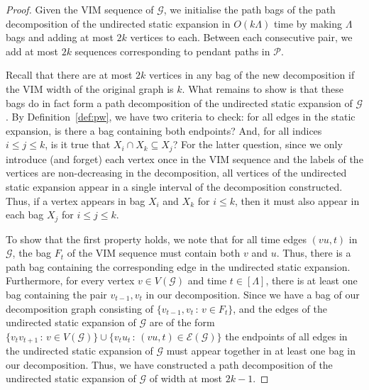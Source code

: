 \documentclass[a4paper,UKenglish,cleveref, autoref, thm-restate]{lipics-v2021} %
\begin{document}
\begin{proof}
    Given the VIM sequence of $\mathcal{G}$, we initialise the path bags of the path decomposition of the undirected static expansion in $O(k\Lambda)$ time by making $\Lambda$ bags and adding at most $2k$ vertices to each. Between each consecutive pair, we add at most $2k$ sequences corresponding to pendant paths in $\mathcal{P}$.

    Recall that there are at most $2k$ vertices in any bag of the new decomposition if the VIM width of the original graph is $k$. 
    What remains to show is that these bags do in fact form a path decomposition of the undirected static expansion of $\mathcal{G}$. By Definition~\ref{def:pw}, we have two criteria to check: for all edges in the static expansion, is there a bag containing both endpoints? And, for all indices $i\leq j\leq k$, is it true that $X_i\cap X_k\subseteq X_j$? For the latter question, since we only introduce (and forget) each vertex once in the VIM sequence and the labels of the vertices are non-decreasing in the decomposition, all vertices of the undirected static expansion appear in a single interval of the decomposition constructed.
    Thus, if a vertex appears in bag $X_i$ and $X_k$ for $i\leq  k$, then it must also appear in each bag $X_j$ for $i\leq j\leq k$.

    To show that the first property holds, we note that for all time edges $(vu,t)$ in $\mathcal{G}$, the bag $F_t$ of the VIM sequence must contain both $v$ and $u$. Thus, there is a path bag containing the corresponding edge in the undirected static expansion. Furthermore, for every vertex $v\in V(\mathcal{G})$ and time $t\in[\Lambda]$, there is at least one bag containing the pair $v_{t-1},v_t$ in our decomposition. Since we have a bag of our decomposition graph consisting of $\{v_{t-1}, v_t \, : \, v\in F_t\}$, and the edges of the undirected static expansion of $\mathcal{G}$ are of the form $\{v_tv_{t+1} \,:\, v\in V(\mathcal{G})\}\cup \{v_{t}u_{t} \, : \, (vu,t)\in \mathcal{E}(\mathcal{G})\}$ the endpoints of all edges in the undirected static expansion of $\mathcal{G}$ must appear together in at least one bag in our decomposition. Thus, we have constructed a path decomposition of the undirected static expansion of $\mathcal{G}$ of width at most $2k-1$.
\end{proof}
\end{document}

